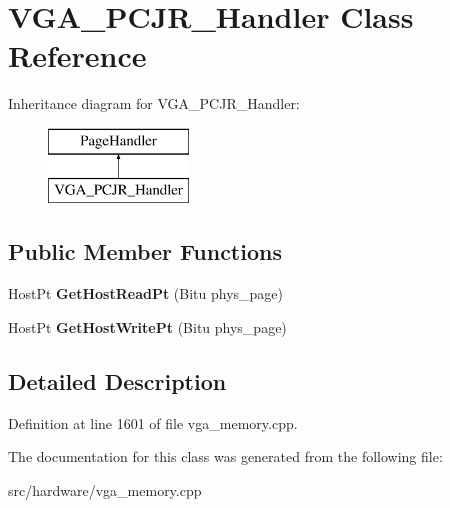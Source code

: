 \hypertarget{classVGA__PCJR__Handler}{\section{V\-G\-A\-\_\-\-P\-C\-J\-R\-\_\-\-Handler Class Reference}
\label{classVGA__PCJR__Handler}
}
Inheritance diagram for V\-G\-A\-\_\-\-P\-C\-J\-R\-\_\-\-Handler\-:\begin{figure}[H]
\begin{center}
\leavevmode
\includegraphics[height=2.000000cm]{classVGA__PCJR__Handler}
\end{center}
\end{figure}
\subsection*{Public Member Functions}
\begin{DoxyCompactItemize}
\item 
\hypertarget{classVGA__PCJR__Handler_a7af2542f4c4e96999dbda7fff177d521}{Host\-Pt {\bfseries Get\-Host\-Read\-Pt} (Bitu phys\-\_\-page)}\label{classVGA__PCJR__Handler_a7af2542f4c4e96999dbda7fff177d521}

\item 
\hypertarget{classVGA__PCJR__Handler_aed69d78cd3e5880a41aa82b1a99d93b3}{Host\-Pt {\bfseries Get\-Host\-Write\-Pt} (Bitu phys\-\_\-page)}\label{classVGA__PCJR__Handler_aed69d78cd3e5880a41aa82b1a99d93b3}

\end{DoxyCompactItemize}


\subsection{Detailed Description}


Definition at line 1601 of file vga\-\_\-memory.\-cpp.



The documentation for this class was generated from the following file\-:\begin{DoxyCompactItemize}
\item 
src/hardware/vga\-\_\-memory.\-cpp\end{DoxyCompactItemize}
